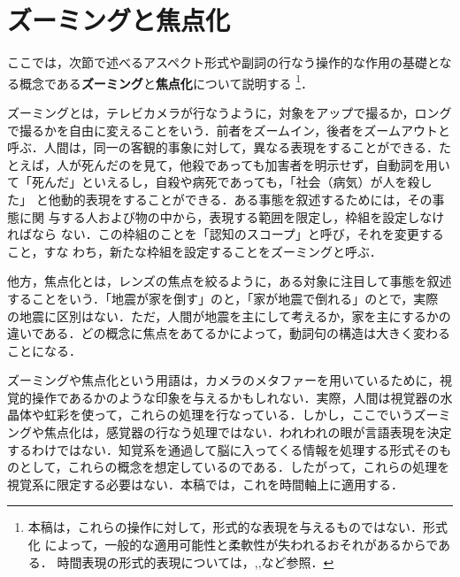 \section{ズーミングと焦点化}

ここでは，次節で述べるアスペクト形式や副詞の行なう操作的な作用の基礎とな
る概念である{\bf ズーミング}と{\bf 焦点化}について説明する
\footnote{
  本稿は，これらの操作に対して，形式的な表現を与えるものではない．形式化
  によって，一般的な適用可能性と柔軟性が失われるおそれがあるからである．
  時間表現の形式的表現については，\cite{原88},\cite{郡司94},\cite{金子
    95}など参照．}．

ズーミングとは，テレビカメラが行なうように，対象をアップで撮るか，ロング
で撮るかを自由に変えることをいう．前者をズームイン，後者をズームアウトと
呼ぶ．人間は，同一の客観的事象に対して，異なる表現をすることができる．た
とえば，人が死んだのを見て，他殺であっても加害者を明示せず，自動詞を用い
て「死んだ」といえるし，自殺や病死であっても，「社会（病気）が人を殺した」
と他動的表現をすることができる．ある事態を叙述するためには，その事態に関
与する人および物の中から，表現する範囲を限定し，枠組を設定しなければなら
ない．この枠組のことを「認知のスコープ」と呼び，それを変更すること，すな
わち，新たな枠組を設定することをズーミングと呼ぶ．

他方，焦点化とは，レンズの焦点を絞るように，ある対象に注目して事態を叙述
することをいう．「地震が家を倒す」のと，「家が地震で倒れる」のとで，実際
の地震に区別はない．ただ，人間が地震を主にして考えるか，家を主にするかの
違いである．どの概念に焦点をあてるかによって，動詞句の構造は大きく変わる
ことになる．

ズーミングや焦点化という用語は，カメラのメタファーを用いているために，視
覚的操作であるかのような印象を与えるかもしれない．実際，人間は視覚器の水
晶体や虹彩を使って，これらの処理を行なっている．しかし，ここでいうズーミ
ングや焦点化は，感覚器の行なう処理ではない．われわれの眼が言語表現を決定
するわけではない．知覚系を通過して脳に入ってくる情報を処理する形式そのも
のとして，これらの概念を想定しているのである．したがって，これらの処理を
視覚系に限定する必要はない．本稿では，これを時間軸上に適用する．

